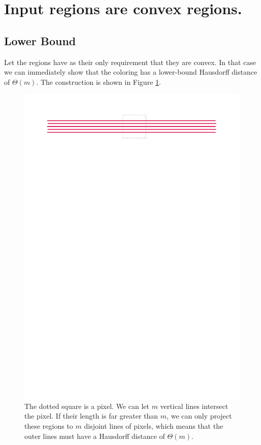 \documentclass[a4paper,UKenglish,cleveref]{lipics-v2019}
\begin{document}



\section{Input regions are convex regions.}\label{sec:convex}
\subsection{Lower Bound}\label{sub:convex_lower}

Let the regions have as their only requirement that they are convex. In that case we can immediately show that the coloring has a lower-bound Hausdorff distance of $\Theta(m)$. The construction is shown in Figure \ref{fig:linesexample}.

\begin{figure}
\centering
\includegraphics[scale=0.8]{Figures/linesexample.pdf}
\caption{The dotted square is a pixel. We can let $m$ vertical lines intersect the pixel. If their length is far greater than $m$, we can only project these regions to $m$ disjoint lines of pixels, which means that the outer lines must have a Hausdorff distance of $\Theta(m)$.}
\label{fig:linesexample}
\end{figure}
\end{document}
